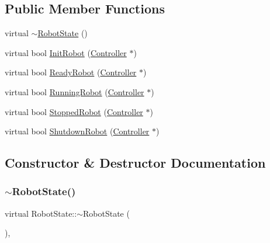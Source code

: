 \subsection*{Public Member Functions}
\begin{DoxyCompactItemize}
\item 
virtual \mbox{\hyperlink{class_robot_state_ade87e1779a44246bd3ca37c4ada8c842}{$\sim$\+Robot\+State}} ()
\item 
virtual bool \mbox{\hyperlink{class_robot_state_a5087ea1ba96b9aad623fe52bbb249b41}{Init\+Robot}} (\mbox{\hyperlink{class_controller}{Controller}} $\ast$)
\item 
virtual bool \mbox{\hyperlink{class_robot_state_a1e8e2842a62f2666b3c687ec090a3b4f}{Ready\+Robot}} (\mbox{\hyperlink{class_controller}{Controller}} $\ast$)
\item 
virtual bool \mbox{\hyperlink{class_robot_state_a34151e935ca2807b89df8ab7f0561487}{Running\+Robot}} (\mbox{\hyperlink{class_controller}{Controller}} $\ast$)
\item 
virtual bool \mbox{\hyperlink{class_robot_state_a58fdf53d3f27201879d4dbf7aaef7ca1}{Stopped\+Robot}} (\mbox{\hyperlink{class_controller}{Controller}} $\ast$)
\item 
virtual bool \mbox{\hyperlink{class_robot_state_a9f2cd6a7ec1022e85d6ac160c6f75e54}{Shutdown\+Robot}} (\mbox{\hyperlink{class_controller}{Controller}} $\ast$)
\end{DoxyCompactItemize}


\subsection{Constructor \& Destructor Documentation}
\mbox{\label{class_robot_state_ade87e1779a44246bd3ca37c4ada8c842}} 
\subsubsection{\texorpdfstring{$\sim$RobotState()}{~RobotState()}}
{\footnotesize\ttfamily virtual Robot\+State\+::$\sim$\+Robot\+State (\begin{DoxyParamCaption}{ }\end{DoxyParamCaption})\hspace{0.3cm}{\ttfamily [inline]}, {\ttfamily [virtual]}}



